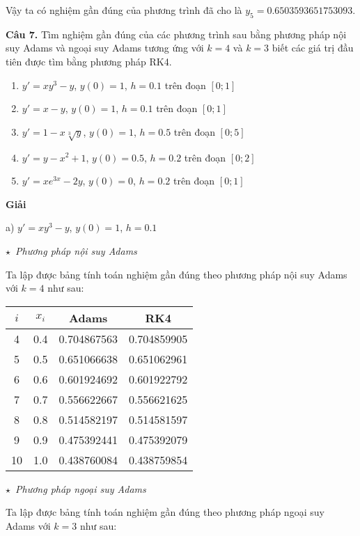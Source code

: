 Vậy ta có nghiệm gần đúng của phương trình đã cho là $y_5 = 0.6503593651753093$.\par

\textbf{Câu 7.} Tìm nghiệm gần đúng của các phương trình sau bằng phương pháp nội suy Adams và ngoại suy Adams tương ứng với $k=4$ và $k=3$ biết các giá trị đầu tiên được tìm bằng phương pháp RK4.
\begin{enumerate}[label=\alph*)]
	\item $y'=xy^3-y$, $y(0)=1$, $h=0.1$ trên đoạn $[0;1]$
	\item $y'=x-y$, $y(0)=1$, $h=0.1$ trên đoạn $[0;1]$
	\item $y'=1-x\sqrt[3]{y}$, $y(0)=1$, $h=0.5$ trên đoạn $[0;5]$
	\item $y'=y-x^2+1$, $y(0)=0.5$, $h=0.2$ trên đoạn $[0;2]$
	\item $y'=xe^{3x}-2y$, $y(0)=0$, $h=0.2$ trên đoạn $[0;1]$
\end{enumerate}

\textbf{Giải}\par

a) $y'=xy^3-y$, $y(0)=1$, $h=0.1$\par

$\star$~\textit{Phương pháp nội suy Adams}\par
Ta lập được bảng tính toán nghiệm gần đúng theo phương pháp nội suy Adams với $k=4$ như sau:

\begin{longtable}{|c|c|c|c|}\hline
$i$&$x_i$&Adams&RK4\\ \hline
\endhead
4  & 0.4 & 0.704867563 & 0.704859905 \\ \hline
5  & 0.5 & 0.651066638 & 0.651062961 \\ \hline
6  & 0.6 & 0.601924692 & 0.601922792 \\ \hline
7  & 0.7 & 0.556622667 & 0.556621625 \\ \hline
8  & 0.8 & 0.514582197 & 0.514581597 \\ \hline
9  & 0.9 & 0.475392441 & 0.475392079 \\ \hline
10 & 1.0 & 0.438760084 & 0.438759854 \\ \hline
\end{longtable}


$\star$~\textit{Phương pháp ngoại suy Adams}\par
Ta lập được bảng tính toán nghiệm gần đúng theo phương pháp ngoại suy Adams với $k=3$ như sau:


